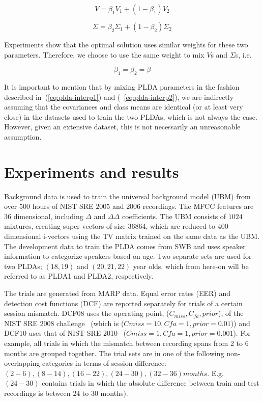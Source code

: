 \documentclass[a4paper]{article}
\begin{document}
\begin{equation}
\label{eq:plda-interp1}
V = \beta_1V_1 + (1 - \beta_1)V_2
\end{equation}

\begin{equation}
\label{eq:plda-interp2}
\Sigma = \beta_2\Sigma_1 + (1 - \beta_2)\Sigma_2
\end{equation}

Experiments show that the optimal solution uses similar weights for these two parameters. Therefore, we choose to use the same weight to mix $V$s and $\Sigma$s, i.e. 


\begin{equation}
\beta_1 = \beta_2 = \beta
\end{equation}

It is important to mention that by mixing PLDA parameters in the fashion described in~(\ref{eq:plda-interp1}) and (~\ref{eq:plda-interp2}), we are indirectly assuming that the covariances and class means are identical (or at least very close) in the datasets used to train the two PLDAs, which is not always the case. However, given an extensive dataset, this is not necessarily an unreasonable assumption. 

 

\section{Experiments and results}
\label{sec:expAndresults}
Background data is used to train the universal background model (UBM) from over $500$ hours of NIST SRE $2005$ and $2006$ recordings. The MFCC features are 36 dimensional, including $\Delta$ and $\Delta\Delta$ coefficients. The UBM consists of $1024$ mixtures, creating super-vectors of size $36864$, which are reduced to $400$ dimensional i-vectors using the TV matrix trained on the same data as the UBM. The development data to train the PLDA comes from SWB and uses speaker information to categorize speakers based on age. Two separate sets are used for two PLDAs; $(18,19)$ and $(20,21,22)$ year olds, which from here-on will be referred to as PLDA1 and PLDA2, respectively.

The trials are generated from MARP data. Equal error rates (EER) and detection cost functions (DCF) are reported separately for trials of a certain session mismatch. DCF08 uses the operating point, ($C_{miss},C_{fa},prior$), of the NIST SRE 2008 challenge~\cite{NIST08} (which is ($Cmiss = 10, Cfa = 1, prior = 0.01$)) and DCF10 uses that of NIST SRE 2010~\cite{NIST10} ($Cmiss = 1, Cfa = 1, prior = 0.001$). For example, all trials in which the mismatch between recording spans from 2 to 6 months are grouped together. The trial sets are in one of the following non-overlapping categories in terms of session difference: $(2-6),(8-14),(16-22),(24-30),(32-36) months$. E.g. $(24-30)$ contains trials in which the absolute difference between train and test recordings is between $24$ to $30$ months). 
\end{document}
